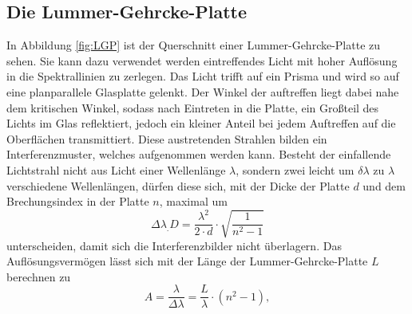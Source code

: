 \subsection{Die Lummer-Gehrcke-Platte}
In Abbildung \ref{fig:LGP} ist der Querschnitt einer Lummer-Gehrcke-Platte zu sehen.
Sie kann dazu verwendet werden eintreffendes Licht mit hoher Auflösung in die Spektrallinien zu zerlegen.
Das Licht trifft auf ein Prisma und wird so auf eine planparallele Glasplatte gelenkt. Der Winkel der auftreffen liegt dabei nahe dem kritischen Winkel, sodass nach Eintreten in die Platte, ein Großteil des Lichts im Glas reflektiert, jedoch ein kleiner Anteil bei jedem Auftreffen auf die Oberflächen transmittiert. Diese austretenden Strahlen bilden ein Interferenzmuster, welches aufgenommen werden kann.
Besteht der einfallende Lichtstrahl nicht aus Licht einer Wellenlänge $\lambda$, sondern zwei leicht um $\delta \lambda$ zu $\lambda$ verschiedene Wellenlängen, dürfen diese sich, mit der Dicke der Platte $d$ und dem Brechungsindex in der Platte $n$, maximal um
\begin{equation}
	\Delta\lambda_.{D} = \frac{\lambda^2}{2 \cdot d} \cdot \sqrt{\frac{1}{n^2-1}} \label{eq:disGebiet}
\end{equation}
unterscheiden, damit sich die Interferenzbilder nicht überlagern.
Das Auflösungsvermögen lässt sich mit der Länge der Lummer-Gehrcke-Platte $L$ berechnen zu
\begin{equation}
	A = \frac{\lambda}{\Delta\lambda} = \frac{L}{\lambda} \cdot \left(n^2-1\right), \label{eq:Aufloesung}
\end{equation}